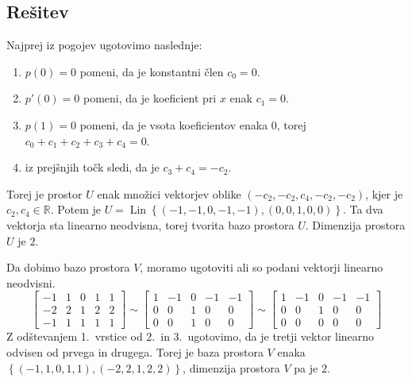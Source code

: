 \documentclass[a4,11pt]{article}
\newcommand{\R}{\mathbb{R}}
\DeclareMathOperator{\Lin}{Lin}
\begin{document}
\subsection*{Rešitev}
    Najprej iz pogojev ugotovimo naslednje: \begin{enumerate}
        \item \(p\left(0\right) = 0\) pomeni, da je konstantni člen \(c_0 = 0\).
        \item \(p'\left(0\right) = 0\) pomeni, da je koeficient pri \(x\) enak \(c_1 = 0\).
        \item \(p\left(1\right) = 0\) pomeni, da je vsota koeficientov enaka \(0\), torej \(c_0 + c_1 + c_2 + c_3 + c_4 = 0\).
        \item iz prejšnjih točk sledi, da je \(c_3 + c_4 = - c_2\).
    \end{enumerate}
    Torej je prostor \(U\) enak množici vektorjev oblike 
    \(\left(- c_2, - c_2, c_4, - c_2, -c_2\right)\), kjer je \(c_2, c_4 \in \R\).
    Potem je \(U = \Lin\left\{\left(-1, -1, 0, -1, -1\right), \left(0, 0, 1, 0, 0\right)\right\}\).
    Ta dva vektorja sta linearno neodvisna, torej tvorita bazo prostora \(U\). Dimenzija prostora \(U\) je \(2\).

    Da dobimo bazo prostora \(V\), moramo ugotoviti ali so podani vektorji linearno neodvisni.
    \[
        \begin{bmatrix}
            -1 & 1 & 0 & 1 & 1 \\
            -2 & 2 & 1 & 2 & 2 \\
            -1 & 1 & 1 & 1 & 1
        \end{bmatrix} \sim \begin{bmatrix}
            1 & -1 & 0 & -1 & -1 \\
            0 & 0 & 1 & 0 & 0 \\
            0 & 0 & 1 & 0 & 0
        \end{bmatrix} \sim \begin{bmatrix}
            1 & -1 & 0 & -1 & -1 \\
            0 & 0 & 1 & 0 & 0 \\
            0 & 0 & 0 & 0 & 0
        \end{bmatrix}
    \]
    Z odštevanjem 1.~vrstice od 2.~in 3.~ugotovimo, da je tretji vektor linearno odvisen od prvega in drugega.
    Torej je baza prostora \(V\) enaka \(\left\{\left(-1, 1, 0, 1, 1\right), \left(-2, 2, 1, 2, 2\right)\right\}\),
    dimenzija prostora \(V\) pa je \(2\).
\end{document}
